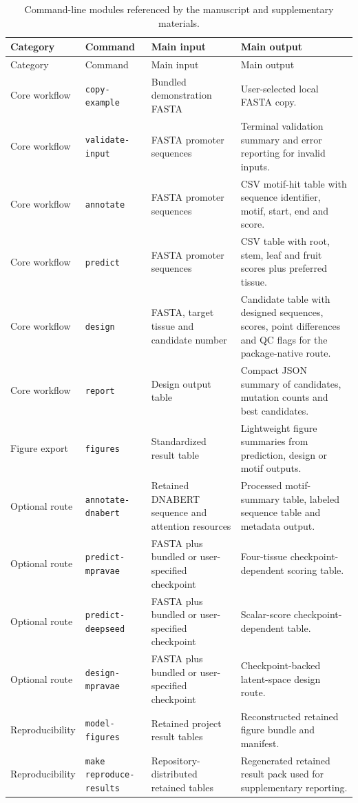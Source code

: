 \documentclass[10pt]{article}
\begin{document}
\begin{longtable}{L{0.16\textwidth}L{0.20\textwidth}L{0.24\textwidth}L{0.29\textwidth}}
\caption{Command-line modules referenced by the manuscript and supplementary materials.}\label{tab:commands}\\
\toprule
Category & Command & Main input & Main output \\
\midrule
\endfirsthead
\toprule
Category & Command & Main input & Main output \\
\midrule
\endhead
Core workflow & \texttt{copy-example} & Bundled demonstration FASTA & User-selected local FASTA copy. \\
Core workflow & \texttt{validate-input} & FASTA promoter sequences & Terminal validation summary and error reporting for invalid inputs. \\
Core workflow & \texttt{annotate} & FASTA promoter sequences & CSV motif-hit table with sequence identifier, motif, start, end and score. \\
Core workflow & \texttt{predict} & FASTA promoter sequences & CSV table with root, stem, leaf and fruit scores plus preferred tissue. \\
Core workflow & \texttt{design} & FASTA, target tissue and candidate number & Candidate table with designed sequences, scores, point differences and QC flags for the package-native route. \\
Core workflow & \texttt{report} & Design output table & Compact JSON summary of candidates, mutation counts and best candidates. \\
Figure export & \texttt{figures} & Standardized result table & Lightweight figure summaries from prediction, design or motif outputs. \\
Optional route & \texttt{annotate-dnabert} & Retained DNABERT sequence and attention resources & Processed motif-summary table, labeled sequence table and metadata output. \\
Optional route & \texttt{predict-mpravae} & FASTA plus bundled or user-specified checkpoint & Four-tissue checkpoint-dependent scoring table. \\
Optional route & \texttt{predict-deepseed} & FASTA plus bundled or user-specified checkpoint & Scalar-score checkpoint-dependent table. \\
Optional route & \texttt{design-mpravae} & FASTA plus bundled or user-specified checkpoint & Checkpoint-backed latent-space design route. \\
Reproducibility & \texttt{model-figures} & Retained project result tables & Reconstructed retained figure bundle and manifest. \\
Reproducibility & \texttt{make reproduce-results} & Repository-distributed retained tables & Regenerated retained result pack used for supplementary reporting. \\
\bottomrule
\end{longtable}
\end{document}
